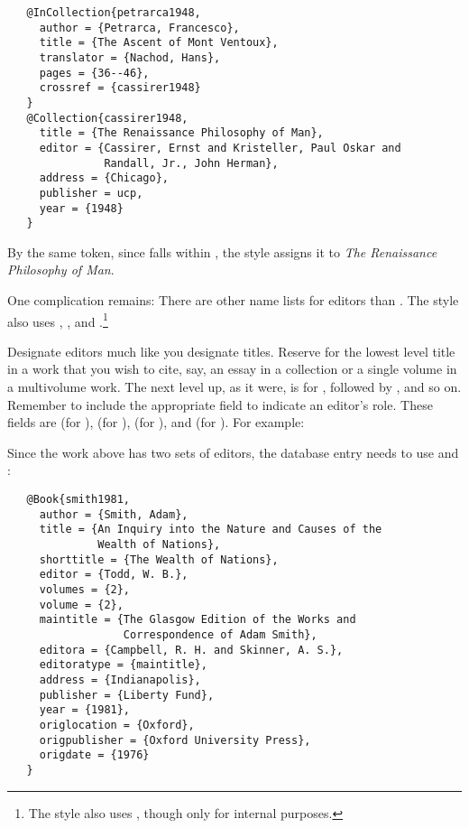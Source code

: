 \documentclass[11pt,letterpaper,oneside]{article}
\begin{document}
\begin{verbatim}
   @InCollection{petrarca1948,
     author = {Petrarca, Francesco},
     title = {The Ascent of Mont Ventoux},
     translator = {Nachod, Hans},
     pages = {36--46},
     crossref = {cassirer1948}
   }
   @Collection{cassirer1948,
     title = {The Renaissance Philosophy of Man},
     editor = {Cassirer, Ernst and Kristeller, Paul Oskar and
               Randall, Jr., John Herman},
     address = {Chicago},
     publisher = ucp,
     year = {1948}
   }
\end{verbatim}

\noindent By the same token, since  falls within
, the style assigns it to \textit{The Renaissance
Philosophy of Man}.

One complication remains: There are other name lists for editors than
. The style also uses ,
, and .\footnote{The style also
uses , though only for internal purposes.}

Designate editors much like you designate titles. Reserve
 for the lowest level title in a work that you wish
to cite, say, an essay in a collection or a single volume in a
multivolume work. The next level up, as it were, is for
, followed by , and so on.
Remember to include the appropriate  field to indicate
an editor's role. These fields are  (for
),  (for ),
 (for ), and
 (for ). For example:

\begin{citebib}
\item \cite{smith1981}
\end{citebib}

\noindent Since the work above has two sets of editors, the database
entry needs to use  and :

\begin{verbatim}
   @Book{smith1981,
     author = {Smith, Adam},
     title = {An Inquiry into the Nature and Causes of the
              Wealth of Nations},
     shorttitle = {The Wealth of Nations},
     editor = {Todd, W. B.},
     volumes = {2},
     volume = {2},
     maintitle = {The Glasgow Edition of the Works and
                  Correspondence of Adam Smith},
     editora = {Campbell, R. H. and Skinner, A. S.},
     editoratype = {maintitle},
     address = {Indianapolis},
     publisher = {Liberty Fund},
     year = {1981},
     origlocation = {Oxford},
     origpublisher = {Oxford University Press},
     origdate = {1976}
   }
\end{verbatim}
\end{document}
